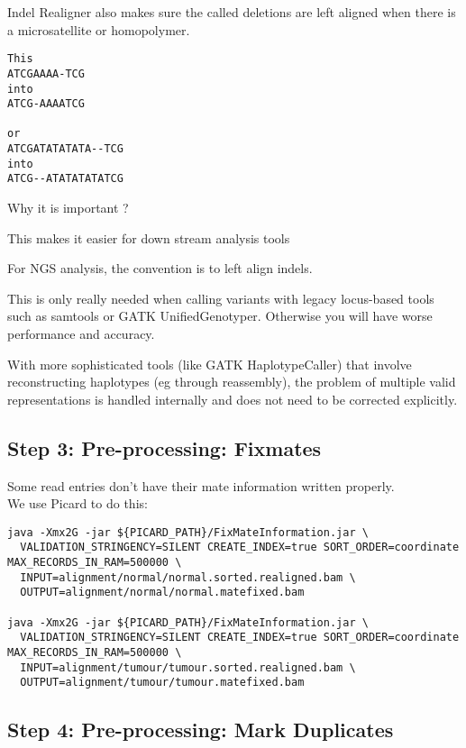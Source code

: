 Indel Realigner also makes sure the called deletions are left aligned when there is a microsatellite or homopolymer.

\begin{verbatim}
This
ATCGAAAA-TCG
into
ATCG-AAAATCG

or
ATCGATATATATA--TCG
into
ATCG--ATATATATATCG
\end{verbatim}


\begin{question} 
Why it is important ? 
\end{question}
\begin{answer}
This makes it easier for down stream analysis tools

For NGS analysis, the convention is to left align indels. 

This is only really needed when calling variants with legacy locus-based tools such as samtools or GATK UnifiedGenotyper. Otherwise you will have worse performance and accuracy.

With more sophisticated tools (like GATK HaplotypeCaller) that involve reconstructing haplotypes (eg through reassembly), the problem of multiple valid representations is handled internally and does not need to be corrected explicitly.
\end{answer}

\subsection{Step 3: Pre-processing: Fixmates}

Some read entries don't have their mate information written properly. \\
We use Picard to do this: 

\begin{lstlisting}
java -Xmx2G -jar ${PICARD_PATH}/FixMateInformation.jar \
  VALIDATION_STRINGENCY=SILENT CREATE_INDEX=true SORT_ORDER=coordinate MAX_RECORDS_IN_RAM=500000 \
  INPUT=alignment/normal/normal.sorted.realigned.bam \
  OUTPUT=alignment/normal/normal.matefixed.bam

java -Xmx2G -jar ${PICARD_PATH}/FixMateInformation.jar \
  VALIDATION_STRINGENCY=SILENT CREATE_INDEX=true SORT_ORDER=coordinate MAX_RECORDS_IN_RAM=500000 \
  INPUT=alignment/tumour/tumour.sorted.realigned.bam \
  OUTPUT=alignment/tumour/tumour.matefixed.bam
\end{lstlisting}

\subsection{Step 4: Pre-processing: Mark Duplicates}

